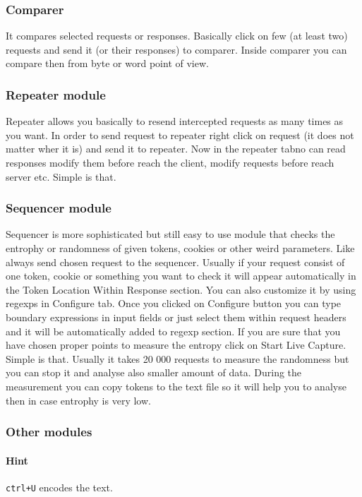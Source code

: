 \documentclass{article}[12pt]
\begin{document}
\subsubsection{Comparer}
\label{subsubsec:comparer}
It compares selected requests or responses.
Basically click on few (at least two) requests and send it (or their responses) to comparer.
Inside comparer you can compare then from byte or word point of view.

\subsubsection{Repeater module}

Repeater allows you basically to resend intercepted requests as many times as you want.
In order to send request to repeater right click on request (it does not matter wher it is) and send it to repeater.
Now in the repeater tabno can read responses modify them before reach the client, modify requests before reach server etc.
Simple is that.


\subsubsection{Sequencer module}
Sequencer is more sophisticated but still easy to use module that checks the entrophy or randomness of given tokens, cookies or other weird parameters.
Like always send chosen request to the sequencer.
Usually if your request consist of one token, cookie or something you want to check it will appear automatically in the Token Location Within Response section.
You can also customize it by using regexps in Configure tab.
Once you clicked on Configure button you can type boundary expressions in input fields or just select them within request headers and it will be automatically added to regexp section.
If you are sure that you have chosen proper points to measure the entropy click on Start Live Capture.
Simple is that.
Usually it takes 20 000 requests to measure the randomness but you can stop it and analyse also smaller amount of data.
During the measurement you can copy tokens to the text file so it will help you to analyse then in case entrophy is very low.

\subsubsection{Other modules}


\paragraph{Hint} \texttt{ctrl+U} encodes the text.
\end{document}
